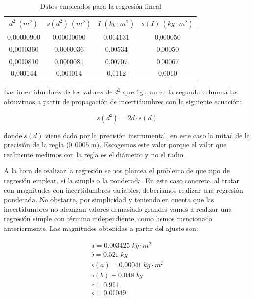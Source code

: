 \documentclass[a4paper,12pt,titlepage]{report}
\begin{document}
\begin{table}[h!]
    \centering
    \begin{tabular}{|c|c|c|c|}
    \hline
    $d^2 \; (m^2)$  & $s(d^2)\; (m^2)$ & $I\; (kg \cdot m^2)$   & $s(I)\; (kg \cdot m^2)$\\ \hline
    0,00000900   & 0,00000090 & 0,004131 & 0,000050 \\ \hline
    0,0000360  & 0,0000036  & 0,00534  & 0,00050  \\ \hline
    0,0000810  & 0,0000081 & 0,00707  & 0,00067  \\ \hline
    0,000144 & 0,000014   & 0,0112   & 0,0010   \\ \hline
    \end{tabular}
    \caption{Datos empleados para la regresión lineal}
    \label{Datos reg Steiner1}
\end{table}

Las incertidumbres de los valores de $d^2$ que figuran en la segunda columna las obtuvimos a partir de propagación de incertidumbres con la siguiente ecuación:

\begin{equation}
    s(d^2) = 2d\cdot s(d)
\end{equation}

donde $s(d)$ viene dado por la precisión instrumental, en este caso la mitad de la precisión de la regla ($0,0005 \; m$). Escogemos este valor porque el valor que realmente medimos con la regla es el diámetro y no el radio.

\par A la hora de realizar la regresión se nos plantea el problema de que tipo de regresión emplear, si la simple o la ponderada. En este caso concreto, al tratar con magnitudes con incertidumbres variables, deberíamos realizar una regresión ponderada. No obstante, por simplicidad y teniendo en cuenta que las incertidumbres no alcanzan valores demasiado grandes vamos a realizar una regresión simple con término independiente, como hemos mencionado anteriormente. Las magnitudes obtenidas a partir del ajuste son:

\begin{equation}
    \begin{gathered}
        a = 0.003425 \; kg\cdot m^2 \\
        b = 0.521 \; kg\\
        s(a) = 0.00041 \; kg\cdot m^2 \\
        s(b) = 0.048 \; kg \\
        r = 0.991 \\
        s = 0.00049
    \end{gathered}
\end{equation}
\end{document}
